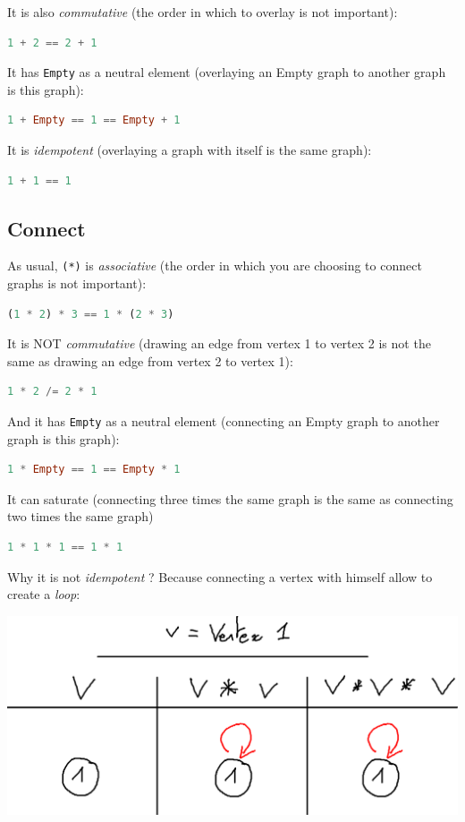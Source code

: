 \documentclass[10pt,a4paper]{article}
\begin{document}
It is also \emph{commutative} (the order in which to overlay is not important):
\begin{lstlisting}[language=Haskell, frame=single]
1 + 2 == 2 + 1
\end{lstlisting}

It has \verb|Empty| as a neutral element (overlaying an Empty graph to another graph is this graph):
\begin{lstlisting}[language=Haskell, frame=single]
1 + Empty == 1 == Empty + 1
\end{lstlisting}

It is \emph{idempotent} (overlaying a graph with itself is the same graph):
\begin{lstlisting}[language=Haskell, frame=single]
1 + 1 == 1
\end{lstlisting}

\subsection{Connect}
As usual, \verb|(*)| is \emph{associative} (the order in which you are choosing to connect graphs is not important):
\begin{lstlisting}[language=Haskell, frame=single]
(1 * 2) * 3 == 1 * (2 * 3)
\end{lstlisting}

It is NOT \emph{commutative} (drawing an edge from vertex 1 to vertex 2 is not the same as drawing an edge from vertex 2 to vertex 1):
\begin{lstlisting}[language=Haskell, frame=single]
1 * 2 /= 2 * 1
\end{lstlisting}

And it has \verb|Empty| as a neutral element (connecting an Empty graph to another graph is this graph):
\begin{lstlisting}[language=Haskell, frame=single]
1 * Empty == 1 == Empty * 1
\end{lstlisting}

It can saturate (connecting three times the same graph is the same as connecting two times the same graph)
\begin{lstlisting}[language=Haskell, frame=single]
1 * 1 * 1 == 1 * 1
\end{lstlisting}

Why it is not \emph{idempotent} ? Because connecting a vertex with himself allow to create a \emph{loop}:

\begin{center}
	\includegraphics[scale=0.5]{figspng/saturate.png}
\end{center}
\end{document}
